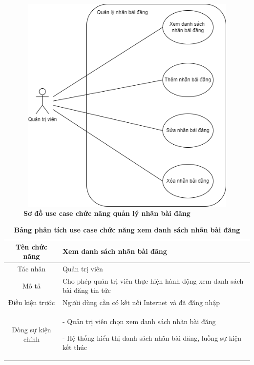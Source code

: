   \begin{figure}[H]
    \centering
    \includegraphics[width=12cm,height=11cm]{Images/use_case/use_case_manage_news_category.png}
    \caption[Sơ đồ use case chức năng quản lý nhãn bài đăng]{\bfseries \fontsize{12pt}{0pt}
    \selectfont Sơ đồ use case chức năng quản lý nhãn bài đăng}
    \label{use_case_news_category_management} %
  \end{figure}

  \begin{table}[H]
    \caption{\bfseries \fontsize{12pt}{0pt}\selectfont Bảng phân tích use case chức năng xem danh sách nhãn bài đăng}
    \centering
    \begin{tabularx}{0.9\textwidth}{|c|X|}
      \hline
      \textbf{Tên chức năng} & \textbf{Xem danh sách nhãn bài đăng} \\
      \hline
      Tác nhân & Quản trị viên \\
      \hline
      Mô tả & Cho phép quản trị viên thực hiện hành động xem danh sách bài đăng tin tức \\
      \hline
      Điều kiện trước & Người dùng cần có kết nối Internet và đã đăng nhập \\
      \hline
      Dòng sự kiện chính & 
        - Quản trị viên chọn xem danh sách nhãn bài đăng
        
        - Hệ thống hiển thị danh sách nhãn bài đăng, luồng sự kiện kết thúc
        \\
      \hline
    \end{tabularx}
  \end{table}


